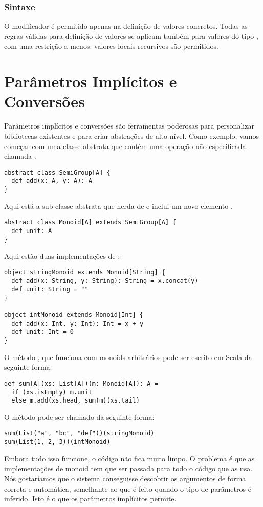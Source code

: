 \subsection*{Sintaxe}
O modificador \lstinline@lazy@ é permitido apenas na definição de valores concretos.
Todas as regras válidas para definição de valores se aplicam também para valores do tipo 
\lstinline@lazy@, com uma restrição a menos: valores locais recursivos são permitidos.

\chapter{Parâmetros Implícitos e Conversões}\label{sec:implicits}

Parâmetros implícitos e conversões são ferramentas poderosas para personalizar bibliotecas
existentes e para criar abstrações de alto-nível.
Como exemplo, vamos começar com uma classe abstrata \lstinline@SemiGroup@ que contém uma operação não especificada chamada \lstinline@add@.
\begin{lstlisting}
abstract class SemiGroup[A] {
  def add(x: A, y: A): A
}
\end{lstlisting}
Aqui está a sub-classe abstrata \lstinline@Monoid@ que herda de  \lstinline@SemiGroup@ e inclui um novo elemento
\lstinline@unit@.
\begin{lstlisting}
abstract class Monoid[A] extends SemiGroup[A] {
  def unit: A
}
\end{lstlisting}
Aqui estão duas implementações de \lstinline@Monoid@:
\begin{lstlisting}
object stringMonoid extends Monoid[String] {
  def add(x: String, y: String): String = x.concat(y)
  def unit: String = ""
}

object intMonoid extends Monoid[Int] {
  def add(x: Int, y: Int): Int = x + y
  def unit: Int = 0
}
\end{lstlisting}
O método \lstinline@sum@, que funciona com monoids arbitrários pode ser escrito em Scala da seguinte forma:
\begin{lstlisting}
def sum[A](xs: List[A])(m: Monoid[A]): A =
  if (xs.isEmpty) m.unit
  else m.add(xs.head, sum(m)(xs.tail)
\end{lstlisting}
O método \lstinline@sum@ pode ser chamado da seguinte forma:
\begin{lstlisting}
sum(List("a", "bc", "def"))(stringMonoid)
sum(List(1, 2, 3))(intMonoid)
\end{lstlisting}
Embora tudo isso funcione, o código não fica muito limpo. O problema
é que as implementações de monoid tem que ser passada para todo o código que as usa.
Nós gostaríamos que o sistema conseguisse descobrir os argumentos de forma correta e automática, semelhante
ao que é feito quando o tipo de parâmetros é inferido. Isto é o que os parâmetros implícitos permite.

